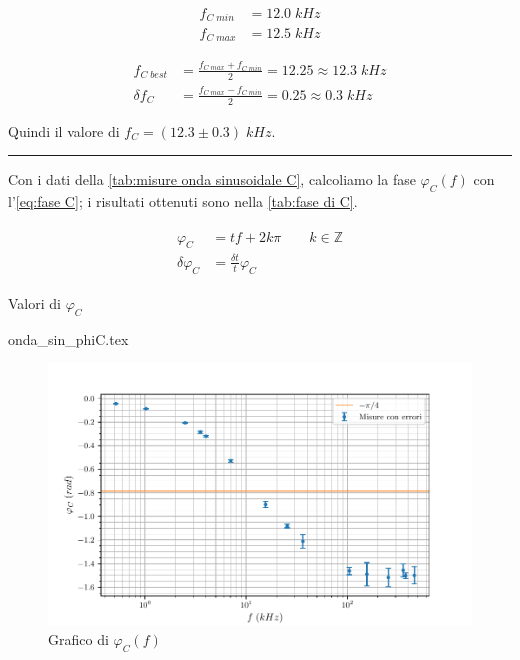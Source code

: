 \documentclass[11pt, a4paper]{article}
\numberwithin{equation}{section} %
\begin{document}
\begin{align*}
    f_{C \; min} &= 12.0 \; kHz \\
    f_{C \; max} &= 12.5 \; kHz
\end{align*}

\begin{align*}
    f_{C \; best} &= \frac{f_{C \; max} + f_{C \; min}}{2} = 12.25 \approx 12.3 \; kHz \\
    \delta f_{C} &= \frac{f_{C \; max} - f_{C \; min}}{2} = 0.25 \approx 0.3 \; kHz
\end{align*}

Quindi il valore di \(f_{C} = (12.3 \pm 0.3) \; kHz\).

\rule{\textwidth}{1pt}

Con i dati della \autoref{tab:misure onda sinusoidale C}, calcoliamo la fase $\varphi_{C}(f)$ con l'\autoref{eq:fase C}; i risultati ottenuti sono nella \autoref{tab:fase di C}.

\begin{align} \label{eq:fase C}
    \begin{split}
        \varphi_{C} &= tf + 2k\pi \qquad k \in \mathbb{Z} \\
        \delta \varphi_{C} &= \frac{\delta t}{t} \varphi_{C}
    \end{split}
\end{align}

\begin{table}[ht!]
    \centering
    \caption{Valori di $\varphi_{C}$}
    {onda_sin_phiC.tex}
    \label{tab:fase di C}
\end{table}


\begin{figure}[ht!]
    \includegraphics{onda_sin_phi(f)_C.pdf}
    \caption{Grafico di $\varphi_{C}(f)$}
    \label{fig:fase C}
\end{figure}
\end{document}
